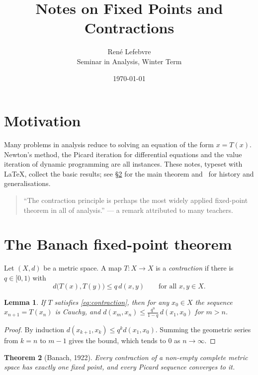 \documentclass[a4paper,11pt]{article}
\title{Notes on Fixed Points and Contractions}
\author{Ren\'e Lefebvre \\ \small Seminar in Analysis, Winter Term}
\date{\today}
\newtheorem{theorem}{Theorem}[section]
\newtheorem{lemma}[theorem]{Lemma}
\begin{document}
\maketitle

\section{Motivation}

Many problems in analysis reduce to solving an equation of the form $x = T(x)$.
Newton's method, the Picard iteration for differential equations and the
value iteration of dynamic programming are all instances. These notes, typeset
with \LaTeX, collect the basic results; see \S\ref{sec:banach} for the main
theorem and~\cite{banach1922,granas2003} for history and generalisations.

\begin{quote}
  ``The contraction principle is perhaps the most widely applied fixed-point
  theorem in all of analysis.'' --- a remark attributed to many teachers.
\end{quote}

\section{The Banach fixed-point theorem}
\label{sec:banach}

Let $(X, d)$ be a metric space. A map $T \colon X \to X$ is a
\emph{contraction} if there is $q \in [0, 1)$ with
\begin{equation}
  d\bigl(T(x), T(y)\bigr) \le q\, d(x, y) \qquad \text{for all } x, y \in X.
  \label{eq:contraction}
\end{equation}

\begin{lemma}
\label{lem:cauchy}
If $T$ satisfies \eqref{eq:contraction}, then for any $x_0 \in X$ the sequence
$x_{n+1} = T(x_n)$ is Cauchy, and $d(x_m, x_n) \le \frac{q^n}{1-q}\, d(x_1, x_0)$
for $m > n$.
\end{lemma}

\begin{proof}
By induction $d(x_{k+1}, x_k) \le q^k d(x_1, x_0)$. Summing the geometric series
from $k = n$ to $m - 1$ gives the bound, which tends to $0$ as $n \to \infty$.
\end{proof}

\begin{theorem}[Banach, 1922]
\label{thm:banach}
Every contraction of a non-empty complete metric space has exactly one fixed
point, and every Picard sequence converges to it.
\end{theorem}
\end{document}
